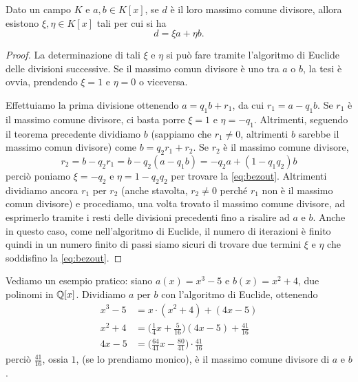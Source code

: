 \begin{teorema} \label{t:bezout}
	Dato un campo $K$ e $a,b\in K[x]$, se $d$ è il loro massimo comune divisore, allora esistono $\xi,\eta\in K[x]$ tali per cui si ha
	\begin{equation}
		d=\xi a+\eta b.
		\label{eq:bezout}
	\end{equation}
\end{teorema}
\begin{proof}
	La determinazione di tali $\xi$ e $\eta$ si può fare tramite l'algoritmo di Euclide delle divisioni successive.
	Se il massimo comun divisore è uno tra $a$ o $b$, la tesi è ovvia, prendendo $\xi=1$ e $\eta=0$ o viceversa.
	
	Effettuiamo la prima divisione ottenendo $a=q_1b+r_1$, da cui $r_1=a-q_1b$.
	Se $r_1$ è il massimo comune divisore, ci basta porre $\xi=1$ e $\eta=-q_1$.
	Altrimenti, seguendo il teorema precedente dividiamo $b$ (sappiamo che $r_1\ne 0$, altrimenti $b$ sarebbe il massimo comun divisore) come $b=q_2r_1+r_2$.
	Se $r_2$ è il massimo comune divisore,
	\begin{equation}
		r_2=b-q_2r_1=b-q_2(a-q_1b)=-q_2a+(1-q_1q_2)b
	\end{equation}
	perciò poniamo $\xi=-q_2$ e $\eta=1-q_2q_2$ per trovare la \eqref{eq:bezout}.
	Altrimenti dividiamo ancora $r_1$ per $r_2$ (anche stavolta, $r_2\ne 0$ perch\'e $r_1$ non è il massimo comun divisore) e procediamo, una volta trovato il massimo comune divisore, ad esprimerlo tramite i resti delle divisioni precedenti fino a risalire ad $a$ e $b$.
	Anche in questo caso, come nell'algoritmo di Euclide, il numero di iterazioni è finito quindi in un numero finito di passi siamo sicuri di trovare due termini $\xi$ e $\eta$ che soddisfino la \eqref{eq:bezout}.
\end{proof}
Vediamo un esempio pratico: siano $a(x)=x^3-5$ e $b(x)=x^2+4$, due polinomi in $\mathbb{Q}[x]$.
Dividiamo $a$ per $b$ con l'algoritmo di Euclide, ottenendo
\begin{equation*}
	\begin{aligned}
		x^3-5&=x\cdot(x^2+4)+(4x-5)\\
		x^2+4&=\Big(\frac14x+\frac5{16}\Big)(4x-5)+\frac{41}{16}\\
		4x-5&=\Big(\frac{64}{41}x-\frac{80}{41}\Big)\cdot\frac{41}{16}
	\end{aligned}
\end{equation*}
perciò $\frac{41}{16}$, ossia $1$, (se lo prendiamo monico), è il massimo comune divisore di $a$ e $b$.
